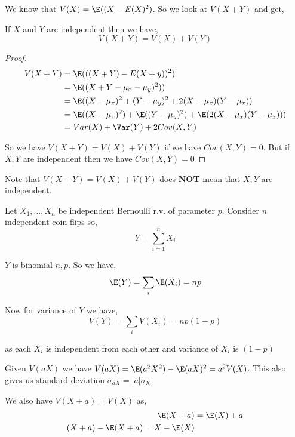 \vspace{1em}

We know that $V(X) = \E((X - E(X)^2) $. So we look at $V(X + Y)$ and get,

\begin{theorem}
	If $X $ and $ Y$ are independent then we have,
	$$
		V(X + Y) = V(X) + V(Y)
	$$
\end{theorem}
\begin{proof}
	\begin{align*}
	V(X + Y) &= \E(((X + Y) - E(X + y))^2) \\
		 &= \E((X + Y - \mu_x - \mu_y)^2))\\
		 &= \E((X - \mu_x)^2 + (Y - \mu_y)^2 + 2(X - \mu_x)(Y - \mu_x))\\
		 &= \E((X - \mu_x)^2) + \E((Y - \mu_y)^2) + \E(2(X - \mu_x)(Y - \mu_x)))\\
		 &= Var(X) + \Var(Y) + 2 Cov(X, Y)
	\end{align*}

	So we have $V(X + Y) = V(X) + V(Y)$ if we have $Cov(X,Y) = 0$. But if $X,Y$ are independent then we have $Cov(X,Y) = 0$
\end{proof}
\begin{remark}
	Note that $V(X + Y) = V(X) + V(Y)$ does \textbf{NOT} mean that $X,Y$ are independent.
\end{remark}
\begin{remark}
	Let $X_{1}, \dots, X_n$ be independent Bernoulli r.v. of parameter $p$. Consider $n$ independent coin flips so, 
	$$
	Y = \sum_{i = 1}^{n} X_i
	$$

	$Y$ is binomial $n, p$. So we have, $$
		\E(Y) = \sum_i \E(X_i) = np
	$$

	Now for variance of $Y$   we have,
	$$
		V(Y) = \sum_i V(X_i) = np( 1- p)
	$$

	as each $X_i$  is independent from each other and variance of $X_i$ is $(1 - p)$
\end{remark}



\vspace{1em}

Given $V(aX)$ we have $V(aX) = \E(a^2 X^2) - \E(a X)^2 = a^2 V(X)$. This also gives us standard deviation $\sigma_{aX} = |a| \sigma_X$.

\vspace{1em}


We also have $V(X + a) = V(X)$ as, 
\begin{align*}
	\E(X + a ) &= \E(X) + a\\
	(X + a) - \E(X + a) = X - \E(X)
\end{align*}

